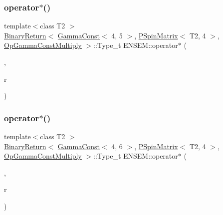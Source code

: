 \subsubsection{\texorpdfstring{operator$\ast$()}{operator*()}\hspace{0.1cm}{\footnotesize\ttfamily [6/64]}}
{\footnotesize\ttfamily template$<$class T2 $>$ \\
\mbox{\hyperlink{structENSEM_1_1BinaryReturn}{Binary\+Return}}$<$ \mbox{\hyperlink{classENSEM_1_1GammaConst}{Gamma\+Const}}$<$ 4, 5 $>$, \mbox{\hyperlink{classENSEM_1_1PSpinMatrix}{P\+Spin\+Matrix}}$<$ T2, 4 $>$, \mbox{\hyperlink{structENSEM_1_1OpGammaConstMultiply}{Op\+Gamma\+Const\+Multiply}} $>$\+::Type\+\_\+t E\+N\+S\+E\+M\+::operator$\ast$ (\begin{DoxyParamCaption}\item[{const \mbox{\hyperlink{classENSEM_1_1GammaConst}{Gamma\+Const}}$<$ 4, 5 $>$ \&}]{,  }\item[{const \mbox{\hyperlink{classENSEM_1_1PSpinMatrix}{P\+Spin\+Matrix}}$<$ T2, 4 $>$ \&}]{r }\end{DoxyParamCaption})\hspace{0.3cm}{\ttfamily [inline]}}

\mbox{\label{group__primspinmatrix_ga6159ef586816bd93e368fd7d18f601ad}} 
\subsubsection{\texorpdfstring{operator$\ast$()}{operator*()}\hspace{0.1cm}{\footnotesize\ttfamily [7/64]}}
{\footnotesize\ttfamily template$<$class T2 $>$ \\
\mbox{\hyperlink{structENSEM_1_1BinaryReturn}{Binary\+Return}}$<$ \mbox{\hyperlink{classENSEM_1_1GammaConst}{Gamma\+Const}}$<$ 4, 6 $>$, \mbox{\hyperlink{classENSEM_1_1PSpinMatrix}{P\+Spin\+Matrix}}$<$ T2, 4 $>$, \mbox{\hyperlink{structENSEM_1_1OpGammaConstMultiply}{Op\+Gamma\+Const\+Multiply}} $>$\+::Type\+\_\+t E\+N\+S\+E\+M\+::operator$\ast$ (\begin{DoxyParamCaption}\item[{const \mbox{\hyperlink{classENSEM_1_1GammaConst}{Gamma\+Const}}$<$ 4, 6 $>$ \&}]{,  }\item[{const \mbox{\hyperlink{classENSEM_1_1PSpinMatrix}{P\+Spin\+Matrix}}$<$ T2, 4 $>$ \&}]{r }\end{DoxyParamCaption})\hspace{0.3cm}{\ttfamily [inline]}}

